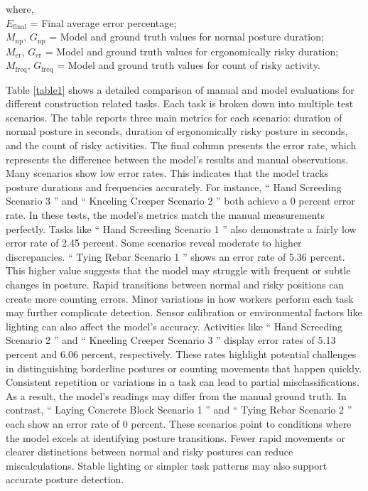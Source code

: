 \documentclass[11pt]{article}
\begin{document}
\noindent where,\\
$E_{\mathrm{final}}$  = Final average error percentage;\\
$M_{\mathrm{np}},\, G_{\mathrm{np}}$  = Model and ground truth values for normal posture duration;\\
$M_{\mathrm{er}},\, G_{\mathrm{er}}$ = Model and ground truth values for ergonomically risky duration;\\
$M_{\mathrm{freq}},\, G_{\mathrm{freq}} $ = Model and ground truth values for count of risky activity.

Table \ref{table1} shows a detailed comparison of manual and model evaluations for different construction related tasks. Each task is broken down into multiple test scenarios. The table reports three main metrics for each scenario: duration of normal posture in seconds, duration of ergonomically risky posture in seconds, and the count of risky activities. The final column presents the error rate, which represents the difference between the model's results and manual observations. Many scenarios show low error rates. This indicates that the model tracks posture durations and frequencies accurately. For instance,   `` Hand Screeding Scenario 3  '' and `` Kneeling Creeper Scenario 2  ''  both achieve a 0 percent error rate. In these tests, the model’s metrics match the manual measurements perfectly. Tasks like   `` Hand Screeding Scenario 1  ''  also demonstrate a fairly low error rate of 2.45 percent. Some scenarios reveal moderate to higher discrepancies.   `` Tying Rebar Scenario 1  ''  shows an error rate of 5.36 percent. This higher value suggests that the model may struggle with frequent or subtle changes in posture. Rapid transitions between normal and risky positions can create more counting errors. Minor variations in how workers perform each task may further complicate detection. Sensor calibration or environmental factors like lighting can also affect the model's accuracy. Activities like   `` Hand Screeding Scenario 2  '' and `` Kneeling Creeper Scenario 3  ''  display error rates of 5.13 percent and 6.06 percent, respectively. These rates highlight potential challenges in distinguishing borderline postures or counting movements that happen quickly. Consistent repetition or variations in a task can lead to partial misclassifications. As a result, the model's readings may differ from the manual ground truth. In contrast,   `` Laying Concrete Block Scenario 1  '' and `` Tying Rebar Scenario 2  ''  each show an error rate of 0 percent. These scenarios point to conditions where the model excels at identifying posture transitions. Fewer rapid movements or clearer distinctions between normal and risky postures can reduce miscalculations. Stable lighting or simpler task patterns may also support accurate posture detection. 
\end{document}
